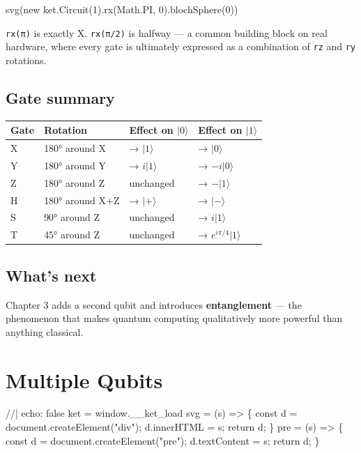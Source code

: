 \documentclass[
  11pt,
  letterpaper,
  oneside]{scrbook}
\newenvironment{Shaded}{\begin{snugshade}}{\end{snugshade}}
\newcommand{\NormalTok}[1]{\textcolor[rgb]{0.00,0.23,0.31}{#1}}
\begin{document}
\begin{Shaded}
\begin{Highlighting}[]
\NormalTok{svg(new ket.Circuit(1).rx(Math.PI, 0).blochSphere(0))}
\end{Highlighting}
\end{Shaded}

\texttt{rx(π)} is exactly X. \texttt{rx(π/2)} is halfway --- a common
building block on real hardware, where every gate is ultimately
expressed as a combination of \texttt{rz} and \texttt{ry} rotations.

\section{Gate summary}\label{gate-summary}

\begin{longtable}[]{@{}llll@{}}
\toprule\noalign{}
Gate & Rotation & Effect on \(|0\rangle\) & Effect on \(|1\rangle\) \\
\midrule\noalign{}
\endhead
\bottomrule\noalign{}
\endlastfoot
X & 180° around X & → \(|1\rangle\) & → \(|0\rangle\) \\
Y & 180° around Y & → \(i|1\rangle\) & → \(-i|0\rangle\) \\
Z & 180° around Z & unchanged & → \(-|1\rangle\) \\
H & 180° around X+Z & → \(|{+}\rangle\) & → \(|{-}\rangle\) \\
S & 90° around Z & unchanged & → \(i|1\rangle\) \\
T & 45° around Z & unchanged & → \(e^{i\pi/4}|1\rangle\) \\
\end{longtable}

\section{What's next}\label{whats-next-1}

Chapter 3 adds a second qubit and introduces \textbf{entanglement} ---
the phenomenon that makes quantum computing qualitatively more powerful
than anything classical.

\chapter{Multiple Qubits}\label{sec-multi-qubit}

\begin{Shaded}
\begin{Highlighting}[]
\NormalTok{//| echo: false}
\NormalTok{ket = window.\_\_ket\_load}
\NormalTok{svg = (s) =\textgreater{} \{ const d = document.createElement("div"); d.innerHTML = s; return d; \}}
\NormalTok{pre = (s) =\textgreater{} \{ const d = document.createElement("pre"); d.textContent = s; return d; \}}
\end{Highlighting}
\end{Shaded}
\end{document}
